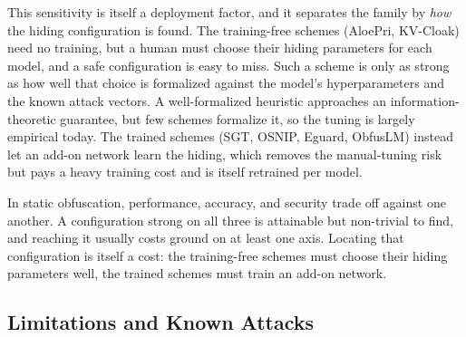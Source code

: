This sensitivity is itself a deployment factor, and it separates the family by \emph{how} the
hiding configuration is found. The training-free schemes
(AloePri, KV-Cloak) need no training, but a human must choose their hiding parameters for each
model, and a safe configuration is easy to miss. Such a scheme is only as strong as how well
that choice is formalized against the model's hyperparameters and the known attack vectors. A
well-formalized heuristic approaches an information-theoretic guarantee, but few schemes
formalize it, so the tuning is largely empirical today. The trained schemes (SGT, OSNIP,
Eguard, ObfusLM) instead let an add-on network learn the hiding, which removes the
manual-tuning risk but pays a heavy training cost and is itself retrained per model.

\begin{keyinsight}
In static obfuscation, performance, accuracy, and security trade off against one another. A
configuration strong on all three is attainable but non-trivial to find, and reaching it
usually costs ground on at least one axis. Locating that configuration is itself a cost: the
training-free schemes must choose their hiding parameters well, the trained schemes must train
an add-on network.
\end{keyinsight}

\subsection{Limitations and Known Attacks}
\label{sec:obfusc-attacks}

